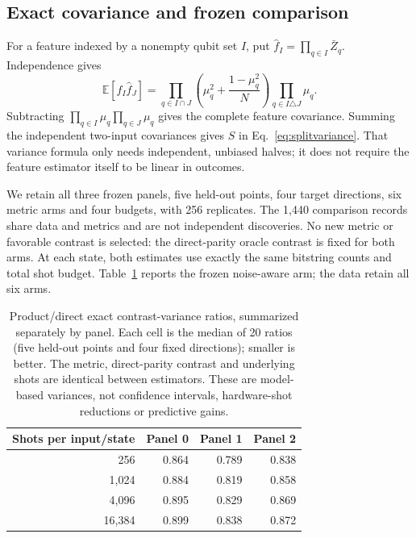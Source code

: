 \subsection{Exact covariance and frozen comparison}
For a feature indexed by a nonempty qubit set $I$, put
$\widehat f_I=\prod_{q\in I}\bar Z_q$. Independence gives
\begin{equation}
 \mathbb E[\widehat f_I\widehat f_J]
 =\prod_{q\in I\cap J}\left(\mu_q^2+\frac{1-\mu_q^2}{N}\right)
  \prod_{q\in I\triangle J}\mu_q.
\end{equation}
Subtracting $\prod_{q\in I}\mu_q\prod_{q\in J}\mu_q$ gives the
complete feature covariance. Summing the independent two-input
covariances gives $S$ in Eq.~\eqref{eq:splitvariance}. That variance
formula only needs independent, unbiased halves; it does not require
the feature estimator itself to be linear in outcomes.

We retain all three frozen panels, five held-out points, four target
directions, six metric arms and four budgets, with 256 replicates.
The 1,440 comparison records share data and metrics and are not
independent discoveries. No new metric or favorable contrast is
selected: the direct-parity oracle contrast is fixed for both arms.
At each state, both estimates use exactly the same bitstring counts
and total shot budget. Table~\ref{tab:productcontrol} reports the
frozen noise-aware arm; the data retain all six arms.

\begin{table}[h]
\centering
\caption{Product/direct exact contrast-variance ratios, summarized
separately by panel. Each cell is the median of 20 ratios (five
held-out points and four fixed directions); smaller is better.
The metric, direct-parity contrast and underlying shots are identical
between estimators. These are model-based variances, not confidence
intervals, hardware-shot reductions or predictive gains.}
\label{tab:productcontrol}
\begin{tabular}{rrrr}
\toprule
Shots per input/state & Panel 0 & Panel 1 & Panel 2\\
\midrule
256 & 0.864 & 0.789 & 0.838\\
1,024 & 0.884 & 0.819 & 0.858\\
4,096 & 0.895 & 0.829 & 0.869\\
16,384 & 0.899 & 0.838 & 0.872\\
\bottomrule
\end{tabular}
\end{table}

